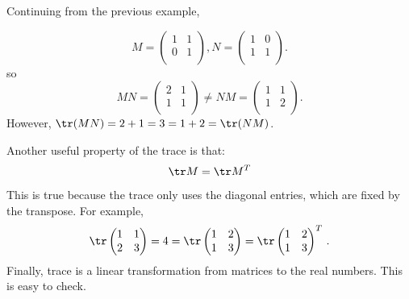 \begin{example}
Continuing from the previous example, 

\[
M= \begin{pmatrix}
1 & 1 \\
0 & 1 \\
\end{pmatrix}, N=
\begin{pmatrix}
1 & 0 \\
1 & 1 \\
\end{pmatrix}.
\]
so
\[
MN = \begin{pmatrix}
2 & 1 \\
1 & 1 \\
\end{pmatrix} \neq
NM = \begin{pmatrix}
1 & 1 \\
1 & 2 \\
\end{pmatrix}.
\]
However, $\tr(MN) = 2+1 = 3 = 1+2 = \tr(NM)$.
\end{example}

Another useful property of the trace is that:
\[\tr M = \tr M^T\] 
This is true because the trace only uses the diagonal entries, which are fixed by the transpose.  For example, 
\[\tr \begin{pmatrix}
1 & 1 \\
2 & 3 \\
\end{pmatrix} = 4 = \tr \begin{pmatrix}
1 & 2 \\
1 & 3 \\
\end{pmatrix} = \tr \begin{pmatrix}
1 & 2 \\
1 & 3 \\
\end{pmatrix}^T\, .
\]
Finally, trace is a linear transformation from matrices to the real numbers.  This is easy to check.


